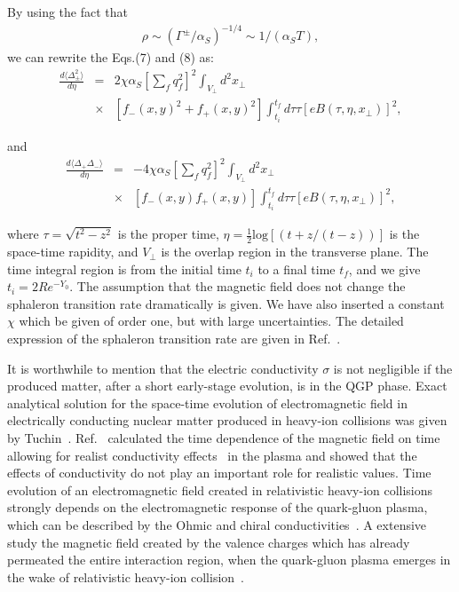 \documentclass[twocolumn,showpacs,preprintnumbers,amsmath,amssymb]{revtex4}
\begin{document}
By using the fact that
\begin{eqnarray}
\rho\sim(\Gamma^{\pm}/\alpha_{S})^{-1/4}\sim1/(\alpha_{S}T),
\label{eq:eq10} %
\end{eqnarray}
\noindent we can rewrite the Eqs.(7) and (8) as:
\begin{eqnarray}
\frac{d\langle\Delta_{\pm}^{2}\rangle}{d\eta}&=&2\chi\alpha_{S}[\sum_{f}q_{f}^{2}]^{2}\int_{V_{\perp}}d^{2}x_{\perp}\\
&\times&[f_{-}(x,y)^{2}+f_{+}(x,y)^{2}]\int_{t_{i}}^{t_{f}}d\tau\tau[eB(\tau,\eta,x_{\perp})]^{2}\nonumber,
\label{eq:eq11} %
\end{eqnarray}

\noindent and
\begin{eqnarray}
\frac{d\langle \Delta_{+}\Delta_{-}\rangle}{d\eta}&=&-4\chi\alpha_{S}[\sum_{f}q_{f}^{2}]^{2}\int_{V_{\perp}}d^{2}x_{\perp}\\
&\times&[f_{-}(x,y)f_{+}(x,y)]\int_{t_{i}}^{t_{f}}d\tau\tau[eB(\tau,\eta,x_{\perp})]^{2}\nonumber,
\label{eq:eq12} %
\end{eqnarray}

\noindent where $\tau=\sqrt{t^{2}-z^{2}}$ is the proper time, $\eta=\frac{1}{2}\textrm{log}[(t+z/(t-z))]$ is the space-time rapidity,
and $V_{\perp}$ is the overlap region  in the transverse plane. The time integral region is
from the initial time $t_{i}$  to a final time $t_{f}$, and we give $t_{i}=2Re^{-Y_{0}}$.
The assumption that the magnetic field does not change the sphaleron transition rate dramatically is given. We have also inserted a constant $\chi$ which
be given of order one, but with large uncertainties. The detailed expression of the sphaleron transition rate are given in Ref.~\cite{lab7}.

It is worthwhile to mention that the electric
conductivity $\sigma$ is not negligible if the produced matter, after a short
early-stage evolution, is in the QGP phase. Exact analytical solution for the space-time evolution of electromagnetic field in electrically conducting nuclear
matter produced in heavy-ion collisions was given by Tuchin~\cite{lab17, lab18}.  Ref.~\cite{lab19}  calculated the time dependence of the magnetic field on time allowing for
realist conductivity effects~\cite{lab26} in the plasma and showed that the effects of conductivity do not play an important role for realistic values.
Time evolution of an electromagnetic field created in relativistic heavy-ion collisions strongly depends on the electromagnetic response of the quark-gluon plasma,
which can be described by the Ohmic and chiral
conductivities~\cite{lab20}. A extensive study the magnetic field created by the valence charges which has already permeated
the entire interaction region, when the quark-gluon plasma
emerges in the wake of relativistic heavy-ion collision~\cite{lab21}.
\end{document}
